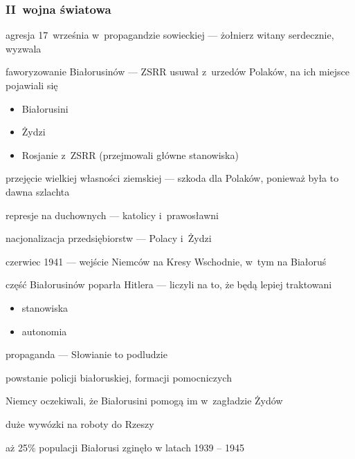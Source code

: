 \subsubsection*{II~wojna światowa}
\begin{description}
    \item agresja 17~września w~propagandzie sowieckiej --- żołnierz witany serdecznie, wyzwala
        \begin{description}
            \item faworyzowanie Białorusinów --- ZSRR usuwał z~urzedów Polaków, na ich miejsce pojawiali się
            \begin{itemize}
                \item Białorusini
                \item Żydzi
                \item Rosjanie z~ZSRR (przejmowali główne stanowiska)
            \end{itemize}
            \item przejęcie wielkiej własności ziemskiej --- szkoda dla Polaków, ponieważ była to dawna szlachta
            \item represje na duchownych --- katolicy i~prawosławni
            \item nacjonalizacja przedsiębiorstw --- Polacy i~Żydzi
        \end{description}
    \item czerwiec 1941 --- wejście Niemców na Kresy Wschodnie, w~tym na Białoruś
        \begin{description}
            \item część Białorusinów poparła Hitlera --- liczyli na to, że będą lepiej traktowani
                \begin{itemize}
                    \item stanowiska
                    \item autonomia
                \end{itemize}
            \item propaganda --- Słowianie to podludzie
            \item powstanie policji białoruskiej, formacji pomocniczych
            \item Niemcy oczekiwali, że Białorusini pomogą im w~zagładzie Żydów
            \item duże wywózki na roboty do Rzeszy
            \item aż 25\% populacji Białorusi zginęło w latach 1939 -- 1945
        \end{description}
\end{description}
